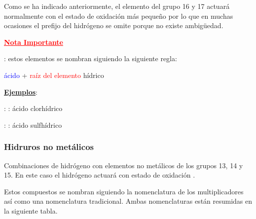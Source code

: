 \documentclass[12pt]{article}
\begin{document}
Como se ha indicado anteriormente, el elemento del grupo 16 y 17 actuará normalmente con el estado de oxidación más pequeño por lo que en muchas ocasiones el prefijo del hidrógeno se omite porque no existe ambigüedad.

\textcolor{red}{\textbf{\underline{Nota Importante}}}

\textbf{}: estos elementos se nombran siguiendo la siguiente regla:
\begin{center}
    \textcolor{blue}{ácido} + \textcolor{red}{raíz del elemento} \textcolor{green!50!black}{hídrico}
\end{center}

\textbf{\uline{Ejemplos}}:

 : : ácido clorhídrico

 : : ácido sulfhídrico

\subsubsection{Hidruros no metálicos}

Combinaciones de hidrógeno con elementos no metálicos de los grupos 13, 14 y 15. En este caso el hidrógeno actuará con estado de oxidación .

Estos compuestos se nombran siguiendo la nomenclatura de los multiplicadores así como una nomenclatura tradicional. Ambas nomenclaturas están resumidas en la siguiente tabla.
\end{document}
